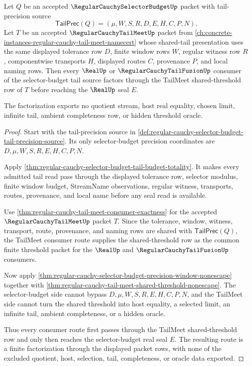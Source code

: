 \begin{theorem}
\label{thm:regular-cauchy-selector-budget-tail-meet-factorization}
Let $Q$ be an accepted $\RegularCauchySelectorBudgetUp$ packet with tail-precision source
$$
\mathsf{TailPrec}(Q)=(\mu,W,S,R,D,E,H,C,P,N).
$$
Let $T$ be an accepted $\RegularCauchyTailMeetUp$ packet from \autoref{ch:concrete-instances-regular-cauchy-tail-meet-namecert} whose shared-tail presentation uses the same displayed tolerance row $D$, finite window rows $W$, regular witness row $R$, componentwise transports $H$, displayed routes $C$, provenance $P$, and local naming rows. Then every $\RealUp$ or $\RegularCauchyTailFusionUp$ consumer of the selector-budget tail source factors through the TailMeet shared-threshold row of $T$ before reaching the $\RealUp$ seal $E$.

The factorization exports no quotient stream, host real equality, chosen limit, infinite tail, ambient completeness row, or hidden threshold oracle.
\end{theorem}
\begin{proof}
Start with the tail-precision source in \autoref{def:regular-cauchy-selector-budget-tail-precision-source}. Its only selector-budget precision coordinates are $D,\mu,W,S,R,E,H,C,P,N$.

Apply \autoref{thm:regular-cauchy-selector-budget-tail-budget-totality}. It makes every admitted tail read pass through the displayed tolerance row, selector modulus, finite window budget, StreamName observations, regular witness, transports, routes, provenance, and local name before any seal read is available.

Use \autoref{thm:regular-cauchy-tail-meet-consumer-exactness} for the accepted $\RegularCauchyTailMeetUp$ packet $T$. Since the tolerance, window, witness, transport, route, provenance, and naming rows are shared with $\mathsf{TailPrec}(Q)$, the TailMeet consumer route supplies the shared-threshold row as the common finite threshold packet for the $\RealUp$ and $\RegularCauchyTailFusionUp$ consumers.

Now apply \autoref{thm:regular-cauchy-selector-budget-precision-window-nonescape} together with \autoref{thm:regular-cauchy-tail-meet-shared-threshold-nonescape}. The selector-budget side cannot bypass $D,\mu,W,S,R,E,H,C,P,N$, and the TailMeet side cannot turn the shared threshold into host equality, a selected limit, an infinite tail, ambient completeness, or a hidden oracle.

Thus every consumer route first passes through the TailMeet shared-threshold row and only then reaches the selector-budget real seal $E$. The resulting route is a finite factorization through the displayed packet rows, with none of the excluded quotient, host, selection, tail, completeness, or oracle data exported.
\end{proof}

